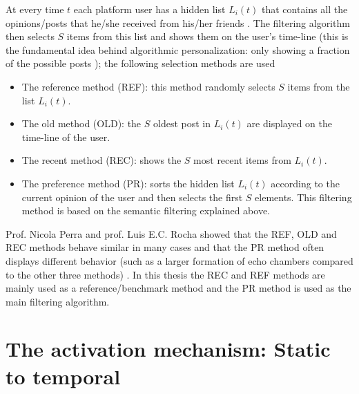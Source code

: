 \documentclass[11 pt , letterpaper , twoside , openright]{book}
\begin{document}
\newline
At every time $t$ each platform user has a hidden list $L_i(t)$ that contains all the opinions/posts that he/she received from his/her friends \cite{Perra2019}. The filtering algorithm then selects $S$ items from this list and shows them on the user's time-line (this is the fundamental idea behind algorithmic personalization: only showing a fraction of the possible posts \cite{Perra2019}); the following selection methods are used \cite{Perra2019}
\begin{itemize}
	\item The reference method (REF): this method randomly selects $S$ items from the list $L_i(t)$.
	\item The old method (OLD): the $S$ oldest post in $L_i(t)$ are displayed on the time-line of the user.
	\item The recent method (REC): shows the $S$ most recent items from $L_i(t)$.
	\item The preference method (PR): sorts the hidden list $L_i(t)$ according to the current opinion of the user and then selects the first $S$ elements. This filtering method is based on the semantic filtering explained above.
\end{itemize}
Prof. Nicola Perra and prof. Luis E.C. Rocha showed that the REF, OLD and REC methods behave similar in many cases and that the PR method often displays different behavior (such as a larger formation of echo chambers compared to the other three methods) \cite{Perra2019}. In this thesis the REC and REF methods are mainly used as a reference/benchmark method and the PR method is used as the main filtering algorithm.

\section{The activation mechanism: Static to temporal}\label{actMech}
\end{document}
